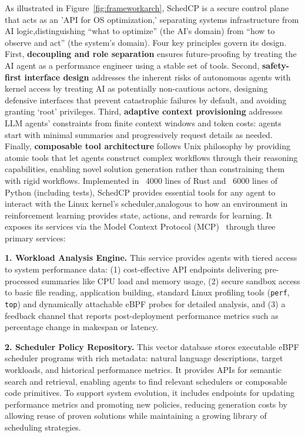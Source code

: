 \documentclass[preprint]{article}
\newcommand{\sys}{SchedCP\xspace}
\begin{document}
As illustrated in Figure~\ref{fig:frameworkarch}, \sys is a secure control plane that acts as an 'API for OS optimization,' separating systems infrastructure from AI logic,distinguishing ``what to optimize'' (the AI's domain) from ``how to observe and act'' (the system's domain). Four key principles govern its design. First, \textbf{decoupling and role separation} ensures future-proofing by treating the AI agent as a performance engineer using a stable set of tools. Second, \textbf{safety-first interface design} addresses the inherent risks of autonomous agents with kernel access by treating AI as potentially non-cautious actors, designing defensive interfaces that prevent catastrophic failures by default, and avoiding granting `root' privileges. Third, \textbf{adaptive context provisioning} addresses LLM agents' constraints from finite context windows and token costs: agents start with minimal summaries and progressively request details as needed. Finally, \textbf{composable tool architecture} follows Unix philosophy by providing atomic tools that let agents construct complex workflows through their reasoning capabilities, enabling novel solution generation rather than constraining them with rigid workflows. Implemented in ~4000 lines of Rust and ~6000 lines of Python (including tests), \sys provides essential tools for any agent to interact with the Linux kernel's scheduler,analogous to how an environment in reinforcement learning provides state, actions, and rewards for learning. It exposes its services via the Model Context Protocol (MCP)~\cite{anthropic2024mcp} through three primary services:


\textbf{1. Workload Analysis Engine.} This service provides agents with tiered access to system performance data: (1) cost-effective API endpoints delivering pre-processed summaries like CPU load and memory usage, (2) secure sandbox access to basic file reading, application building, standard Linux profiling tools (\texttt{perf}, \texttt{top}) and dynamically attachable eBPF probes for detailed analysis, and (3) a feedback channel that reports post-deployment performance metrics such as percentage change in makespan or latency.

\textbf{2. Scheduler Policy Repository.} This vector database stores executable eBPF scheduler programs with rich metadata: natural language descriptions, target workloads, and historical performance metrics. It provides APIs for semantic search and retrieval, enabling agents to find relevant schedulers or composable code primitives. To support system evolution, it includes endpoints for updating performance metrics and promoting new policies, reducing generation costs by allowing reuse of proven solutions while maintaining a growing library of scheduling strategies.
\end{document}
